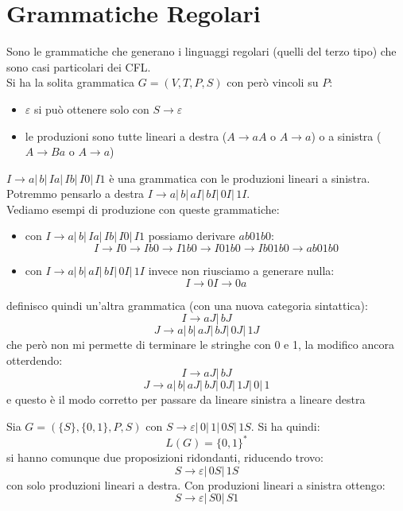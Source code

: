 \section{Grammatiche Regolari}
Sono le grammatiche che generano i linguaggi regolari (quelli del terzo tipo) che sono casi particolari dei CFL.\\
Si ha la solita grammatica $G = (V, T, P, S)$ con però vincoli su $P$:
\begin{itemize}
	\item $\varepsilon$ si può ottenere solo con $S\to \varepsilon$
	\item le produzioni sono tutte lineari a destra ($A\to aA$ o $A\to a$) o a sinistra ($A\to Ba$ o $A\to a$)
\end{itemize}
\begin{example}
	$I\to a|\,b|\,Ia|\,Ib|\,I0|\,I1$ è una grammatica con le produzioni lineari a sinistra.\\
	Potremmo pensarlo a destra $I\to a|\,b|\,aI|\,bI|\,0I|\,1I$.\\
	Vediamo esempi di produzione con queste grammatiche:
	\begin{itemize}
		\item con $I\to a|\,b|\,Ia|\,Ib|\,I0|\,I1$ possiamo derivare $ab01b0$:
					$$I\to I0\to Ib0\to I1b0\to I01b0\to Ib01b0\to ab01b0$$
		\item con $I\to a|\,b|\,aI|\,bI|\,0I|\,1I$ invece non riusciamo a generare nulla:
					$$I\to 0I\to 0a$$
	\end{itemize}
	definisco quindi un'altra grammatica (con una nuova categoria sintattica):
	$$I\to aJ|\, bJ$$
	$$J\to a|\,b|\,aJ|\,bJ|\,0J|\,1J$$
	che però non mi permette di terminare le stringhe con 0 e 1, la modifico ancora otterdendo:
	$$I\to aJ|\, bJ$$
	$$J\to a|\,b|\,aJ|\,bJ|\,0J|\,1J|\,0|\,1$$
	e questo è il modo corretto per passare da lineare sinistra a lineare destra
\end{example}
\begin{example}
	Sia $G=(\{S\},\{0,1\},P,S)$ con $S\to \varepsilon|\,0|\,1|\,0S|\,1S$. Si ha quindi:
	$$L(G)=\{0,1\}^*$$
	si hanno comunque due proposizioni ridondanti, riducendo trovo:
	$$S\to \varepsilon|\, 0S|\,1S$$
	con solo produzioni lineari a destra. Con produzioni lineari a sinistra ottengo:
	$$S\to \varepsilon|\, S0|\,S1$$
\end{example}
